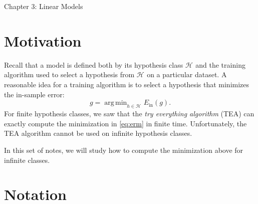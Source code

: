 \documentclass[10pt]{exam}
\theoremstyle{definition}
\newtheorem{defn}{Definition}
\DeclareMathOperator*{\argmin}{arg\,min}
\newcommand{\Ein}{E_{\text{in}}}
\newcommand{\HH}[1]{\mathcal H_{\text{#1}}}
\begin{document}
\begin{center}
{
\Huge
Chapter 3: Linear Models
}
\end{center}


\section*{Motivation}

Recall that a model is defined both by its hypothesis class $\HH{}$ and the training algorithm used to select a hypothesis from $\HH{}$ on a particular dataset.
A reasonable idea for a training algorithm is to select a hypothesis that minimizes the in-sample error:
\begin{equation}
    \label{eq:erm}
    g = \argmin_{h\in\HH{}} \Ein(g).
\end{equation}
%
    For finite hypothesis classes, we saw that the \emph{try everything algorithm} (TEA) can exactly compute the minimization in \eqref{eq:erm} in finite time.
    Unfortunately, the TEA algorithm cannot be used on infinite hypothesis classes.

    In this set of notes, we will study how to compute the minimization above for infinite classes.
%

\section*{Notation}
\end{document}
